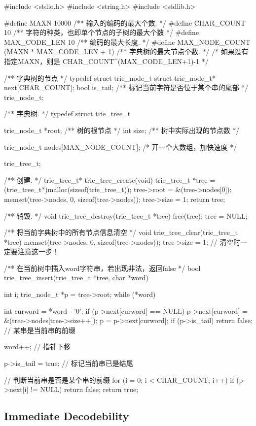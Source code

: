 \begin{Codex}[label=trie_tree.c]
#include <stdio.h>
#include <string.h>
#include <stdlib.h>


#define MAXN 10000   /** 输入的编码的最大个数. */
#define CHAR_COUNT  10 /** 字符的种类，也即单个节点的子树的最大个数 */
#define MAX_CODE_LEN 10 /** 编码的最大长度. */
#define MAX_NODE_COUNT  (MAXN * MAX_CODE_LEN + 1)  /** 字典树的最大节点个数. */
                   /* 如果没有指定MAXN，则是 CHAR_COUNT^(MAX_CODE_LEN+1)-1 */

/** 字典树的节点 */
typedef struct trie_node_t {
    struct trie_node_t* next[CHAR_COUNT];
    bool is_tail; /** 标记当前字符是否位于某个串的尾部 */
} trie_node_t;

/** 字典树. */
typedef struct trie_tree_t {
    trie_node_t *root; /** 树的根节点 */
    int size; /** 树中实际出现的节点数 */

    trie_node_t nodes[MAX_NODE_COUNT]; /* 开一个大数组，加快速度 */
} trie_tree_t;

/** 创建. */
trie_tree_t* trie_tree_create(void) {
    trie_tree_t *tree = (trie_tree_t*)malloc(sizeof(trie_tree_t));
    tree->root = &(tree->nodes[0]);
    memset(tree->nodes, 0, sizeof(tree->nodes));
    tree->size = 1;
    return tree;
}

/** 销毁. */
void trie_tree_destroy(trie_tree_t *tree) {
    free(tree);
    tree = NULL;
}

/** 将当前字典树中的所有节点信息清空 */
void trie_tree_clear(trie_tree_t *tree) {
    memset(tree->nodes, 0, sizeof(tree->nodes));
    tree->size = 1; // 清空时一定要注意这一步！
}

/** 在当前树中插入word字符串，若出现非法，返回false */
bool trie_tree_insert(trie_tree_t *tree, char *word) {
    int i;
    trie_node_t *p = tree->root;
    while (*word) {
        int curword = *word - '0';
        if (p->next[curword] == NULL) {
            p->next[curword] = &(tree->nodes[tree->size++]);
        }
        p = p->next[curword];
        if (p->is_tail) return false; // 某串是当前串的前缀

        word++; // 指针下移
    }

    p->is_tail = true; // 标记当前串已是结尾

    // 判断当前串是否是某个串的前缀
    for (i = 0; i < CHAR_COUNT; i++)
        if (p->next[i] != NULL)
            return false;
    return true;
}
\end{Codex}


\subsection{Immediate Decodebility}


